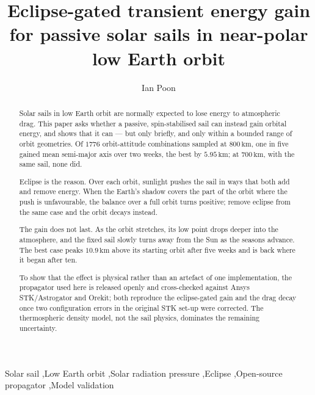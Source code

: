 \documentclass[preprint,12pt]{elsarticle}
\begin{document}
\begin{frontmatter}

\title{Eclipse-gated transient energy gain for passive solar sails in
near-polar low Earth orbit}

\author[imperial]{Ian Poon}


\begin{abstract}
Solar sails in low Earth orbit are normally expected to lose energy to
atmospheric drag. This paper asks whether a passive, spin-stabilised sail can
instead gain orbital energy, and shows that it can --- but only briefly, and
only within a bounded range of orbit geometries. Of \(1776\) orbit-attitude
combinations sampled at \(800\,\mathrm{km}\), one in five gained mean
semi-major axis over two weeks, the best by \(5.95\,\mathrm{km}\); at
\(700\,\mathrm{km}\), with the same sail, none did.

Eclipse is the reason. Over each orbit, sunlight pushes the sail in ways that
both add and remove energy. When the Earth's shadow covers the part of the
orbit where the push is unfavourable, the balance over a full orbit turns
positive; remove eclipse from the same case and the orbit decays instead.

The gain does not last. As the orbit stretches, its low point drops deeper
into the atmosphere, and the fixed sail slowly turns away from the Sun as the
seasons advance. The best case peaks \(10.9\,\mathrm{km}\) above its starting
orbit after five weeks and is back where it began after ten.

To show that the effect is physical rather than an artefact of one
implementation, the propagator used here is released openly and cross-checked
against Ansys STK/Astrogator and Orekit; both reproduce the eclipse-gated gain
and the drag decay once two configuration errors in the original STK set-up
were corrected. The thermospheric density model, not the sail physics,
dominates the remaining uncertainty.
\end{abstract}

\begin{keyword}
Solar sail \sep Low Earth orbit \sep Solar radiation pressure \sep Eclipse
\sep Open-source propagator \sep Model validation
\end{keyword}

\end{frontmatter}
\end{document}
